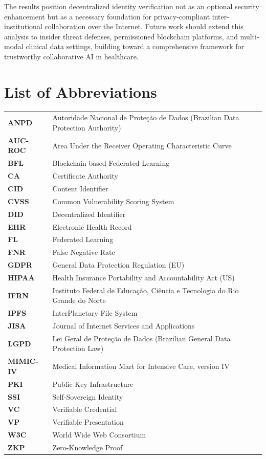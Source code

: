 \documentclass{sbc2023}
\begin{document}
The results position decentralized identity verification not as an optional security enhancement but as a necessary foundation for privacy-compliant inter-institutional collaboration over the Internet. Future work should extend this analysis to insider threat defenses, permissioned blockchain platforms, and multi-modal clinical data settings, building toward a comprehensive framework for trustworthy collaborative AI in healthcare.


\section*{List of Abbreviations}

\begin{tabular}{ll}
\textbf{ANPD} & Autoridade Nacional de Proteção de Dados (Brazilian Data Protection Authority) \\
\textbf{AUC-ROC} & Area Under the Receiver Operating Characteristic Curve \\
\textbf{BFL} & Blockchain-based Federated Learning \\
\textbf{CA} & Certificate Authority \\
\textbf{CID} & Content Identifier \\
\textbf{CVSS} & Common Vulnerability Scoring System \\
\textbf{DID} & Decentralized Identifier \\
\textbf{EHR} & Electronic Health Record \\
\textbf{FL} & Federated Learning \\
\textbf{FNR} & False Negative Rate \\
\textbf{GDPR} & General Data Protection Regulation (EU) \\
\textbf{HIPAA} & Health Insurance Portability and Accountability Act (US) \\
\textbf{IFRN} & Instituto Federal de Educação, Ciência e Tecnologia do Rio Grande do Norte \\
\textbf{IPFS} & InterPlanetary File System \\
\textbf{JISA} & Journal of Internet Services and Applications \\
\textbf{LGPD} & Lei Geral de Proteção de Dados (Brazilian General Data Protection Law) \\
\textbf{MIMIC-IV} & Medical Information Mart for Intensive Care, version IV \\
\textbf{PKI} & Public Key Infrastructure \\
\textbf{SSI} & Self-Sovereign Identity \\
\textbf{VC} & Verifiable Credential \\
\textbf{VP} & Verifiable Presentation \\
\textbf{W3C} & World Wide Web Consortium \\
\textbf{ZKP} & Zero-Knowledge Proof \\
\end{tabular}
\end{document}
